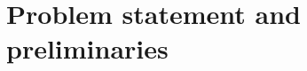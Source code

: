 \documentclass[pdflatex,sn-mathphys-num]{sn-jnl}%
\theoremstyle{thmstyleone}%
\theoremstyle{thmstyletwo}%
\theoremstyle{thmstylethree}%
\begin{document}




\section{Problem statement and preliminaries}
\end{document}
